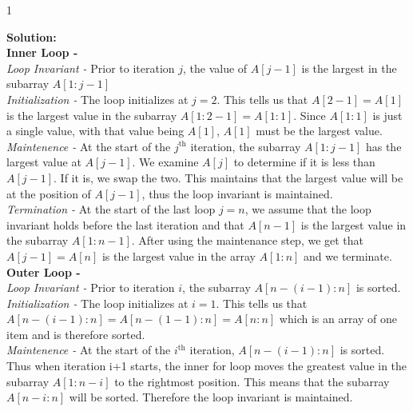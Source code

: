 \documentclass[9pt]{article}
\def\solutions{1}
\begin{document}
        \if\solutions1
        \vspace{2mm}
        
        \textbf{Solution:} \\
        
        \textbf{Inner Loop -}\\
        \textit{Loop Invariant - } Prior to iteration $j$, the value of $A[j-1]$ is the largest in the subarray $A[1 : j-1]$\\
        
        \textit{Initialization - } The loop initializes at $j=2$. This tells us that $A[2-1] = A[1]$ is the largest value in the subarray $A[1:2-1] = A[1:1]$. Since $A[1:1]$ is just a single value, with that value being $A[1]$, $A[1]$ must be the largest value.\\
        
        \textit{Maintenence - } At the start of the $j^{\text{th}}$ iteration, the subarray $A[1 : j-1]$ has the largest value at $A[j-1]$. We examine $A[j]$ to determine if it is less than $A[j-1]$. If it is, we swap the two. This maintains that the largest value will be at the position of $A[j-1]$, thus the loop invariant is maintained. \\
        
        \textit{Termination - } At the start of the last loop $j=n$, we assume that the loop invariant holds before the last iteration and that $A[n-1]$ is the largest value in the subarray $A[1 : n-1]$. After using the maintenance step, we get that $A[j-1] = A[n]$ is the largest value in the array $A[1 : n]$ and we terminate. \\
        
        \textbf{Outer Loop -}\\
        \textit{Loop Invariant - } Prior to iteration $i$, the subarray $A[n-(i-1) : n]$ is sorted. \\
        
        \textit{Initialization - } The loop initializes at $i=1$. This tells us that $A[n-(i-1) : n] = A[n-(1-1) : n] = A[n : n]$ which is an array of one item and is therefore sorted. \\
        
        \textit{Maintenence - } At the start of the $i^{\text{th}}$ iteration, $A[n-(i-1) : n]$ is sorted. Thus when iteration i+1 starts, the inner for loop moves the greatest value in the subarray $A[1 : n-i]$ to the rightmost position. This means that the subarray $A[n-i : n]$ will be sorted. Therefore the loop invariant is maintained. \\
        
\end{document}

